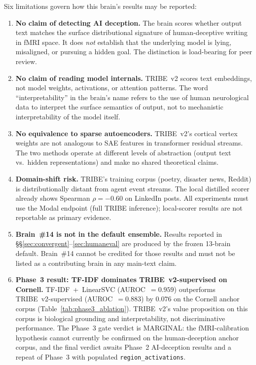 \documentclass{article}
\begin{document}
Six limitations govern how this brain's results may be reported:

\begin{enumerate}
\item \textbf{No claim of detecting AI deception.} The brain scores
  whether output text matches the surface distributional signature of
  human-deceptive writing in fMRI space. It does \emph{not} establish
  that the underlying model is lying, misaligned, or pursuing a hidden
  goal. The distinction is load-bearing for peer review.

\item \textbf{No claim of reading model internals.} TRIBE~v2 scores
  text embeddings, not model weights, activations, or attention
  patterns. The word ``interpretability'' in the brain's name refers to
  the use of human neurological data to interpret the surface semantics
  of output, not to mechanistic interpretability of the model itself.

\item \textbf{No equivalence to sparse autoencoders.} TRIBE~v2's
  cortical vertex weights are not analogous to SAE features in
  transformer residual streams. The two methods operate at different
  levels of abstraction (output text vs.\ hidden representations) and
  make no shared theoretical claims.

\item \textbf{Domain-shift risk.} TRIBE's training corpus (poetry,
  disaster news, Reddit) is distributionally distant from agent event
  streams. The local distilled scorer already shows Spearman
  $\rho = -0.60$ on LinkedIn posts. All experiments must use the Modal
  endpoint (full TRIBE inference); local-scorer results are not
  reportable as primary evidence.

\item \textbf{Brain~\#14 is not in the default ensemble.} Results
  reported in \S\S\ref{sec:convergent}--\ref{sec:humaneval} are
  produced by the frozen 13-brain default. Brain~\#14 cannot be
  credited for those results and must not be listed as a contributing
  brain in any main-text claim.

\item \textbf{Phase~3 result: TF-IDF dominates TRIBE~v2-supervised on
  Cornell.} TF-IDF~+~LinearSVC (AUROC~$= 0.959$) outperforms
  TRIBE~v2-supervised (AUROC~$= 0.883$) by $0.076$ on the Cornell
  anchor corpus (Table~\ref{tab:phase3_ablation}). TRIBE~v2's value
  proposition on this corpus is biological grounding and
  interpretability, not discriminative performance. The Phase~3 gate
  verdict is MARGINAL: the fMRI-calibration hypothesis cannot currently
  be confirmed on the human-deception anchor corpus, and the final
  verdict awaits Phase~2 AI-deception results and a repeat of Phase~3
  with populated \texttt{region\_activations}.
\end{enumerate}
\end{document}
